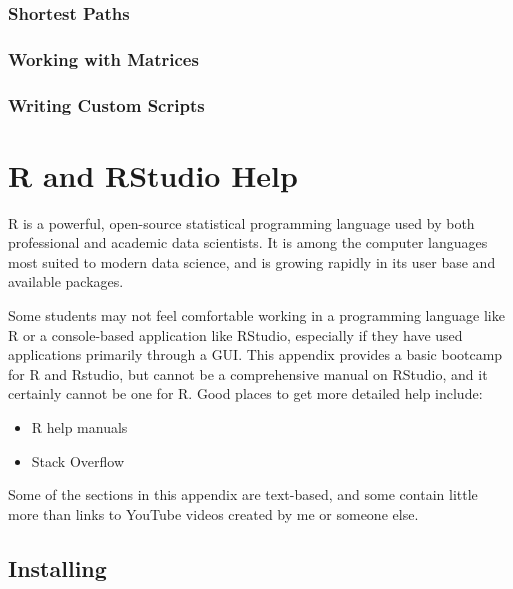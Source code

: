 \documentclass[]{book}
\providecommand{\tightlist}{%
  \setlength{\itemsep}{0pt}\setlength{\parskip}{0pt}}
\begin{document}
\hypertarget{shortest-paths}{%
\subsection{Shortest Paths}\label{shortest-paths}}

\hypertarget{working-with-matrices}{%
\subsection{Working with Matrices}\label{working-with-matrices}}

\hypertarget{writing-custom-scripts}{%
\subsection{Writing Custom Scripts}\label{writing-custom-scripts}}

\hypertarget{app-rstudio}{%
\chapter{R and RStudio Help}\label{app-rstudio}}

R is a powerful, open-source statistical programming language used by both
professional and academic data scientists. It is among the computer languages
most suited to modern data science, and is growing rapidly in its user base and
available packages.

Some students may not feel comfortable working in a programming language like R or
a console-based application like RStudio, especially if they have used applications
primarily through a GUI.
This appendix provides a basic bootcamp for R and Rstudio, but cannot be a
comprehensive manual on RStudio, and it certainly cannot be one for R. Good
places to get more detailed help include:

\begin{itemize}
\tightlist
\item
  R help manuals
\item
  Stack Overflow
\end{itemize}

Some of the sections in this appendix are text-based, and some contain little
more than links to YouTube videos created by me or someone else.

\hypertarget{installing}{%
\section{Installing}\label{installing}}
\end{document}
